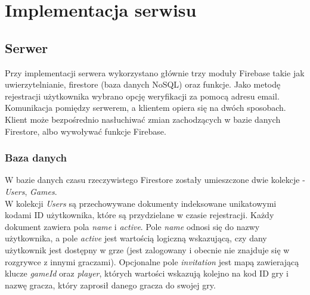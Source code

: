 \chapter{Implementacja serwisu}
\thispagestyle{chapterBeginStyle}

\section{Serwer}

Przy implementacji serwera wykorzystano głównie trzy moduły Firebase takie jak uwierzytelnianie, firestore (baza danych NoSQL) oraz funkcje. Jako metodę rejestracji użytkownika wybrano opcję weryfikacji za pomocą adresu email. Komunikacja pomiędzy serwerem, a klientem opiera się na dwóch sposobach. Klient może bezpośrednio nasłuchiwać zmian zachodzących w bazie danych Firestore, albo wywoływać funkcje Firebase.

\subsection{Baza danych}

W bazie danych czasu rzeczywistego Firestore zostały umieszczone dwie kolekcje - \emph{Users}, \emph{Games}. \\

W kolekcji \emph{Users} są przechowywane dokumenty indeksowane unikatowymi kodami ID użytkownika, które są przydzielane w czasie rejestracji. Każdy dokument zawiera pola \emph{name} i \emph{active}. Pole \emph{name} odnosi się do nazwy użytkownika, a pole \emph{active} jest wartością logiczną wskazującą, czy dany użytkownik jest dostępny w grze (jest zalogowany i obecnie nie znajduje się w rozgrywce z innymi graczami). Opcjonalne pole \emph{invitation} jest mapą zawierającą klucze \emph{gameId} oraz \emph{player}, których wartości wskazują kolejno na kod ID gry i nazwę gracza, który zaprosił danego gracza do swojej gry. \\

